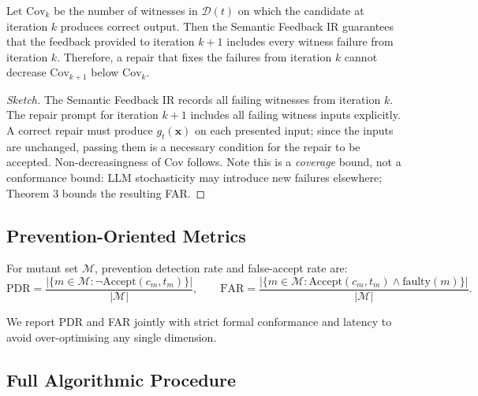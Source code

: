 \begin{theorem}
\label{thm:repair-monotonicity}
Let $\mathrm{Cov}_k$ be the number of witnesses in $\mathcal{D}(t)$ on which the
candidate at iteration $k$ produces correct output.  Then the Semantic Feedback IR
guarantees that the feedback provided to iteration $k+1$ includes every witness failure
from iteration $k$.  Therefore, a repair that fixes the failures from iteration $k$
cannot decrease $\mathrm{Cov}_{k+1}$ below $\mathrm{Cov}_k$.
\end{theorem}
\begin{proof}[Sketch]
The Semantic Feedback IR records all failing witnesses from iteration $k$.  The repair
prompt for iteration $k+1$ includes all failing witness inputs explicitly.  A correct
repair must produce $g_t(\mathbf{x})$ on each presented input; since the inputs are
unchanged, passing them is a necessary condition for the repair to be accepted.
Non-decreasingness of $\mathrm{Cov}$ follows.  Note this is a \emph{coverage} bound, not
a conformance bound: LLM stochasticity may introduce new failures elsewhere; Theorem 3
bounds the resulting FAR.
\end{proof}

\subsection{Prevention-Oriented Metrics}
\label{subsec:metrics}

For mutant set $\mathcal{M}$, prevention detection rate and false-accept rate are:
\begin{equation}
  \mathrm{PDR} = \frac{|\{m \in \mathcal{M} : \neg\mathrm{Accept}(c_m, t_m)\}|}{|\mathcal{M}|},
  \qquad
  \mathrm{FAR} = \frac{|\{m \in \mathcal{M} : \mathrm{Accept}(c_m, t_m) \land \text{faulty}(m)\}|}{|\mathcal{M}|}.
\end{equation}

We report PDR and FAR jointly with strict formal conformance and latency to avoid
over-optimising any single dimension.

\subsection{Full Algorithmic Procedure}
\label{subsec:algorithm}

